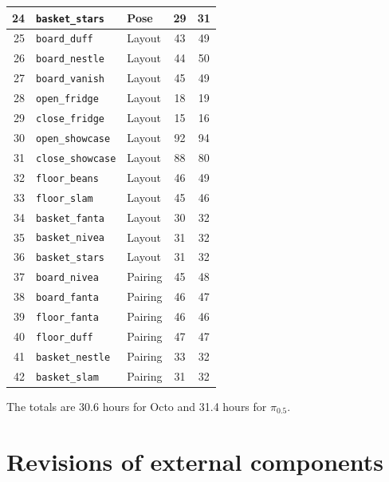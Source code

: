 {\begin{longtable}{rllcc}
24 & \texttt{basket\_stars} & Pose & 29 & 31 \\
\midrule
25 & \texttt{board\_duff} & Layout & 43 & 49 \\
26 & \texttt{board\_nestle} & Layout & 44 & 50 \\
27 & \texttt{board\_vanish} & Layout & 45 & 49 \\
28 & \texttt{open\_fridge} & Layout & 18 & 19 \\
29 & \texttt{close\_fridge} & Layout & 15 & 16 \\
30 & \texttt{open\_showcase} & Layout & 92 & 94 \\
31 & \texttt{close\_showcase} & Layout & 88 & 80 \\
32 & \texttt{floor\_beans} & Layout & 46 & 49 \\
33 & \texttt{floor\_slam} & Layout & 45 & 46 \\
34 & \texttt{basket\_fanta} & Layout & 30 & 32 \\
35 & \texttt{basket\_nivea} & Layout & 31 & 32 \\
36 & \texttt{basket\_stars} & Layout & 31 & 32 \\
\midrule
37 & \texttt{board\_nivea} & Pairing & 45 & 48 \\
38 & \texttt{board\_fanta} & Pairing & 46 & 47 \\
39 & \texttt{floor\_fanta} & Pairing & 46 & 46 \\
40 & \texttt{floor\_duff} & Pairing & 47 & 47 \\
41 & \texttt{basket\_nestle} & Pairing & 33 & 32 \\
42 & \texttt{basket\_slam} & Pairing & 31 & 32 \\
\end{longtable}}
The totals are 30.6 hours for Octo and 31.4 hours for $\pi_{0.5}$.

\section{Revisions of external components}

